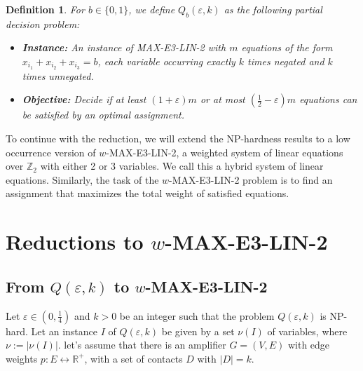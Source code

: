 \documentclass[12pt]{article}
\newtheorem{definition}{Definition}
\begin{document}
\begin{definition}
    For $b\in \{0,1\}$, we define $Q_b(\varepsilon, k)$ as the following partial decision problem:
    \begin{itemize}
        \item \textbf{Instance:} An instance of MAX-E3-LIN-2 with $m$ equations of the form $x_{i_1} + x_{i_2} + x_{i_3} = b$, each variable occurring exactly $k$ times negated and $k$ times unnegated. 
        \item \textbf{Objective:} Decide if at least $(1 + \varepsilon)m$ or at most $(\frac{1}{2} - \varepsilon)m$ equations can be satisfied by an optimal assignment.
    \end{itemize}
\end{definition}
To continue with the reduction, we will extend the NP-hardness results to a low occurrence version of $w$-MAX-E3-LIN-2, a weighted system of linear equations over $\mathbb{Z}_2$ with either 2 or 3 variables.
We call this a hybrid system of linear equations. Similarly, the task of the $w$-MAX-E3-LIN-2 problem is to find an assignment that maximizes the total weight of satisfied equations.

\section{Reductions to $w$-MAX-E3-LIN-2}
\subsection{From $Q(\varepsilon, k)$ to $w$-MAX-E3-LIN-2}
Let $\varepsilon \in (0, \frac{1}{4})$ and $k>0$ be an integer such that the problem $Q(\varepsilon, k)$ is NP-hard. Let an instance $I$ of $Q(\varepsilon, k)$ be given by a set $\nu(I)$ of variables, where $\nu:=|\nu(I)|$.
let's assume that there is an amplifier $G=(V,E)$ with edge weights $p:E\leftrightarrow \mathbb{R}^+$, with a set of contacts $D$ with $|D|=k$. 
\end{document}
